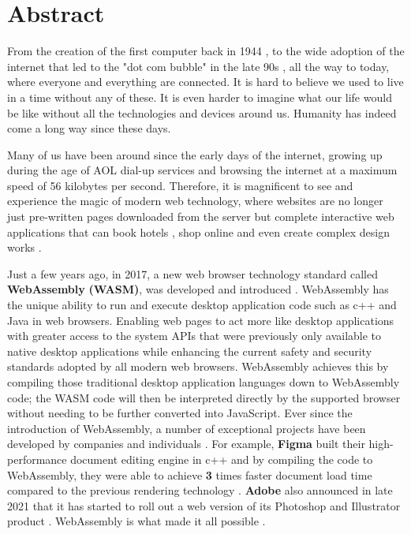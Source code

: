 \chapter*{Abstract}

From the creation of the first computer back in 1944 \cite{abs1}, to the wide adoption of the internet that led to the "dot com bubble" in the late 90s \cite{abs2}, all the way to today, where everyone and everything are connected. It is hard to believe we used to live in a time without any of these. It is even harder to imagine what our life would be like without all the technologies and devices around us. Humanity has indeed come a long way since these days.

Many of us have been around since the early days of the internet, growing up during the age of AOL dial-up services and browsing the internet at a maximum speed of 56 kilobytes per second. Therefore, it is magnificent to see and experience the magic of modern web technology, where websites are no longer just pre-written pages downloaded from the server but complete interactive web applications that can book hotels \cite{abs3}, shop online \cite{abs4} and even create complex design works \cite{abs5}.

Just a few years ago, in 2017, a new web browser technology standard called \textbf{WebAssembly} \textbf{(WASM)}, was developed and introduced \cite{abs6}. WebAssembly has the unique ability to run and execute desktop application code such as c++ and Java in web browsers. Enabling web pages to act more like desktop applications with greater access to the system APIs that were previously only available to native desktop applications while enhancing the current safety and security standards adopted by all modern web browsers. WebAssembly achieves this by compiling those traditional desktop application languages down to WebAssembly code; the WASM code will then be interpreted directly by the supported browser without needing to be further converted into JavaScript. Ever since the introduction of WebAssembly, a number of exceptional projects have been developed by companies and individuals \cite{abs7}. For example, \textbf{Figma} \cite{abs5} built their high-performance document editing engine in c++ and by compiling the code to WebAssembly, they were able to achieve \textbf{3} times faster document load time compared to the previous rendering technology \cite{abs8}. \textbf{Adobe} also announced in late 2021 that it has started to roll out a web version of its Photoshop and Illustrator product \cite{abs9}\cite{abs10}. WebAssembly is what made it all possible \cite{abs11}.

